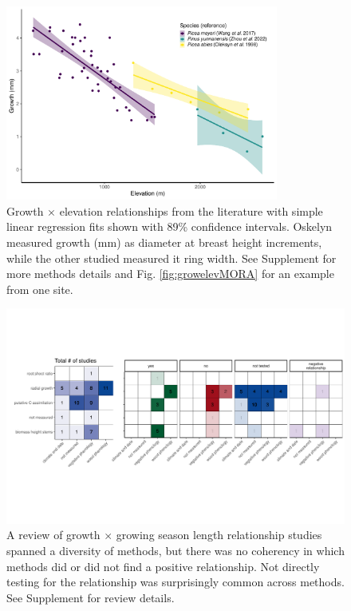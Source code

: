 \documentclass[11pt]{article}
\begin{document}
\begin{figure}[h!]
\includegraphics[width=0.8\textwidth]{..//analyses/growthxelevationetc/figures/growthbyelevation_plot.pdf}
\caption{Growth $\times$ elevation relationships from the literature with simple linear regression fits shown with 89\% confidence intervals. Oskelyn measured growth (mm) as diameter at breast height increments, while the other studied measured it ring width. See Supplement for more methods details and Fig. \ref{fig:growelevMORA} for an example from one site.}
\label{fig:gxelev}
\end{figure}

\clearpage
\begin{figure}[h!]
\includegraphics[width=1\textwidth]{..//figures/heatmaps/combinedheatmap_gslxgrowth_simple.pdf}
\caption{A review of growth $\times$ growing season length relationship studies spanned a diversity of methods, but there was no coherency in which methods did or did not find a positive relationship. Not directly testing for the relationship was surprisingly common across methods. See Supplement for review details.}
\label{fig:heatmaps}
\end{figure}
\end{document}
